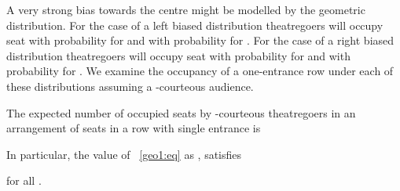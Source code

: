 \documentclass[11pt]{llncs}
\begin{document}
A very strong bias towards the centre might be modelled by the geometric distribution. 
For the case of a left biased distribution theatregoers will occupy seat  with probability 
for  and with probability  for . 
For the case of a right biased distribution theatregoers will occupy seat
 with probability  for  and with probability  for .
We examine the occupancy of a one-entrance row under each of these distributions assuming 
a -courteous audience. 





\begin{theorem}
\label{thm1geol}
The expected number of occupied seats by -courteous 
theatregoers in an arrangement of  seats
in a row with single entrance is 

In particular, the value  of ~\eqref{geo1:eq} as , satisfies 

for all .
\end{theorem}
\end{document}
